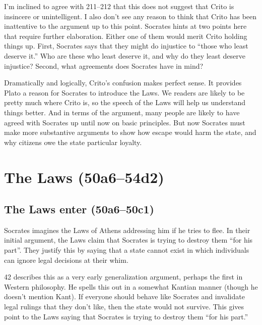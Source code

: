 \documentclass[12pt,letterpaper]{article}
\begin{document}
I'm inclined to agree with \cite{brickhouse-smith2004-plato-trial-of-socrates} 211--212 that this does not suggest that Crito is insincere or unintelligent.
I also don't see any reason to think that Crito has been inattentive to the argument up to this point.
Socrates hints at two points here that require further elaboration.
Either one of them would merit Crito holding things up.
First, Socrates says that they might do injustice to ``those who least deserve it.''
Who are these who least deserve it, and why do they least deserve injustice?
Second, what agreements does Socrates have in mind?

Dramatically and logically, Crito's confusion makes perfect sense.
It provides Plato a reason for Socrates to introduce the Laws.
We readers are likely to be pretty much where Crito is, so the speech of the Laws will help us understand things better.
And in terms of the argument, many people are likely to have agreed with Socrates up until now on basic principles.
But now Socrates must make more substantive arguments to show how escape would harm the state, and why citizens owe the state particular loyalty.


\section*{The Laws (50a6--54d2)}

\subsection*{The Laws enter (50a6--50c1)}

Socrates imagines the Laws of Athens addressing him if he tries to flee.
In their initial argument, the Laws claim that Socrates is trying to destroy them ``for his part''.
They justify this by saying that a state cannot exist in which individuals can ignore legal decisions at their whim.

\cite{kraut-socrates-state-1984} 42 describes this as a very early generalization argument, perhaps the first in Western philosophy.
He spells this out in a somewhat Kantian manner (though he doesn't mention Kant).
If everyone should behave like Socrates and invalidate legal rulings that they don't like, then the state would not survive.
This gives point to the Laws saying that Socrates is trying to destroy them ``for his part.''
\end{document}

